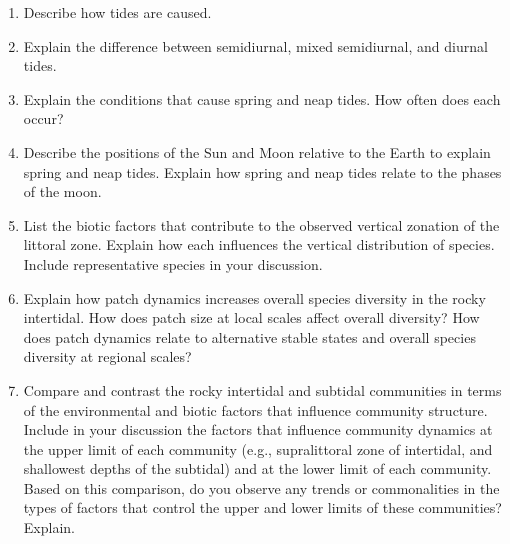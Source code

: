 \documentclass[nofonts, letterpaper]{tufte-handout}
\begin{document}
\begin{enumerate}

	\item Describe how tides are caused.

	\item Explain the difference between semidiurnal, mixed semidiurnal, and diurnal tides.

	\item Explain the conditions that cause spring and neap tides. How often does each occur?
	
	\item Describe the positions of the Sun and Moon relative to the Earth to explain spring and neap tides. Explain how spring and neap tides relate to the phases of the moon.

\item
  List the biotic factors that contribute to the observed vertical
  zonation of the littoral zone. Explain how each influences the
  vertical distribution of species. Include representative species in
  your discussion.
\item
  Explain how patch dynamics increases overall species diversity in the
  rocky intertidal. How does patch size at local scales affect overall
  diversity? How does patch dynamics relate to alternative stable states
  and overall species diversity at regional scales?
\item
  Compare and contrast the rocky intertidal and subtidal communities in
  terms of the environmental and biotic factors that influence community
  structure. Include in your discussion the factors that influence
  community dynamics at the upper limit of each community (e.g.,
  supralittoral zone of intertidal, and shallowest depths of the
  subtidal) and at the lower limit of each community. Based on this
  comparison, do you observe any trends or commonalities in the types of
  factors that control the upper and lower limits of these communities?
  Explain.


\end{enumerate}
\end{document}
